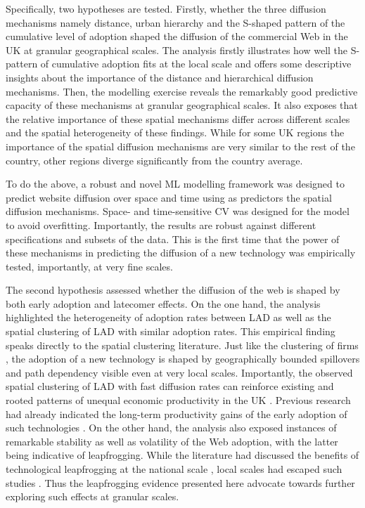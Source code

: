 \documentclass[
  authoryear,
  preprint,
  3p]{elsarticle}
\begin{document}
Specifically, two hypotheses are tested. Firstly, whether the three
diffusion mechanisms namely distance, urban hierarchy and the S-shaped
pattern of the cumulative level of adoption shaped the diffusion of the
commercial Web in the UK at granular geographical scales. The analysis
firstly illustrates how well the S-pattern of cumulative adoption fits
at the local scale and offers some descriptive insights about the
importance of the distance and hierarchical diffusion mechanisms. Then,
the modelling exercise reveals the remarkably good predictive capacity
of these mechanisms at granular geographical scales. It also exposes
that the relative importance of these spatial mechanisms differ across
different scales and the spatial heterogeneity of these findings. While
for some UK regions the importance of the spatial diffusion mechanisms
are very similar to the rest of the country, other regions diverge
significantly from the country average.

To do the above, a robust and novel ML modelling framework was designed
to predict website diffusion over space and time using as predictors the
spatial diffusion mechanisms. Space- and time-sensitive CV was designed
for the model to avoid overfitting. Importantly, the results are robust
against different specifications and subsets of the data. This is the
first time that the power of these mechanisms in predicting the
diffusion of a new technology was empirically tested, importantly, at
very fine scales.

The second hypothesis assessed whether the diffusion of the web is
shaped by both early adoption and latecomer effects. On the one hand,
the analysis highlighted the heterogeneity of adoption rates between LAD
as well as the spatial clustering of LAD with similar adoption rates.
This empirical finding speaks directly to the spatial clustering
literature. Just like the clustering of firms
\citep{boschma2011emerging, audretsch1998innovation}, the adoption of a
new technology is shaped by geographically bounded spillovers and path
dependency visible even at very local scales. Importantly, the observed
spatial clustering of LAD with fast diffusion rates can reinforce
existing and rooted patterns of unequal economic productivity in the UK
\citep{mccann2022productivity}. Previous research had already indicated
the long-term productivity gains of the early adoption of such
technologies \citep{tranosuk}. On the other hand, the analysis also
exposed instances of remarkable stability as well as volatility of the
Web adoption, with the latter being indicative of leapfrogging. While
the literature had discussed the benefits of technological leapfrogging
at the national scale \citep{teece2008firm, perkins2005international},
local scales had escaped such studies \citep{yu2018sustainability}. Thus
the leapfrogging evidence presented here advocate towards further
exploring such effects at granular scales.
\end{document}
